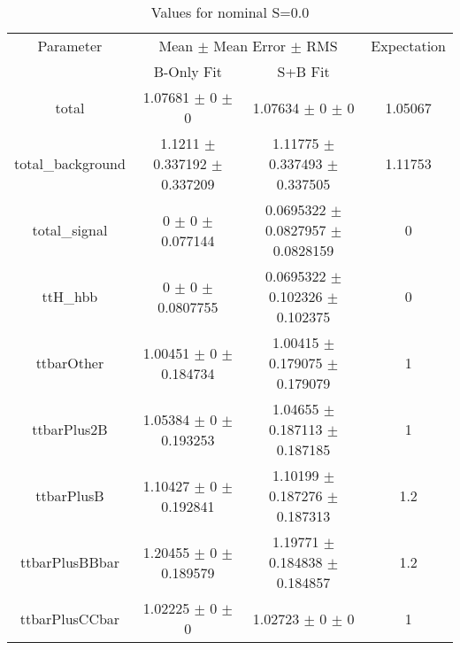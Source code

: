 \begin{table}
\centering
\caption{Values for nominal S=0.0}
\begin{tabular}{cccc}
\toprule
Parameter & \multicolumn{2}{c}{Mean $\pm$ Mean Error $\pm$ RMS} & Expectation\\
 & B-Only Fit & S+B Fit & \\
\midrule
total & \num{1.07681} $\pm$ \num{0} $\pm$ \num{0} & \num{1.07634} $\pm$ \num{0} $\pm$ \num{0} & \num{1.05067}\\
total\_background & \num{1.1211} $\pm$ \num{0.337192} $\pm$ \num{0.337209} & \num{1.11775} $\pm$ \num{0.337493} $\pm$ \num{0.337505} & \num{1.11753}\\
total\_signal & \num{0} $\pm$ \num{0} $\pm$ \num{0.077144} & \num{0.0695322} $\pm$ \num{0.0827957} $\pm$ \num{0.0828159} & \num{0}\\
ttH\_hbb & \num{0} $\pm$ \num{0} $\pm$ \num{0.0807755} & \num{0.0695322} $\pm$ \num{0.102326} $\pm$ \num{0.102375} & \num{0}\\
ttbarOther & \num{1.00451} $\pm$ \num{0} $\pm$ \num{0.184734} & \num{1.00415} $\pm$ \num{0.179075} $\pm$ \num{0.179079} & \num{1}\\
ttbarPlus2B & \num{1.05384} $\pm$ \num{0} $\pm$ \num{0.193253} & \num{1.04655} $\pm$ \num{0.187113} $\pm$ \num{0.187185} & \num{1}\\
ttbarPlusB & \num{1.10427} $\pm$ \num{0} $\pm$ \num{0.192841} & \num{1.10199} $\pm$ \num{0.187276} $\pm$ \num{0.187313} & \num{1.2}\\
ttbarPlusBBbar & \num{1.20455} $\pm$ \num{0} $\pm$ \num{0.189579} & \num{1.19771} $\pm$ \num{0.184838} $\pm$ \num{0.184857} & \num{1.2}\\
ttbarPlusCCbar & \num{1.02225} $\pm$ \num{0} $\pm$ \num{0} & \num{1.02723} $\pm$ \num{0} $\pm$ \num{0} & \num{1}\\
\bottomrule
\end{tabular}
\end{table}